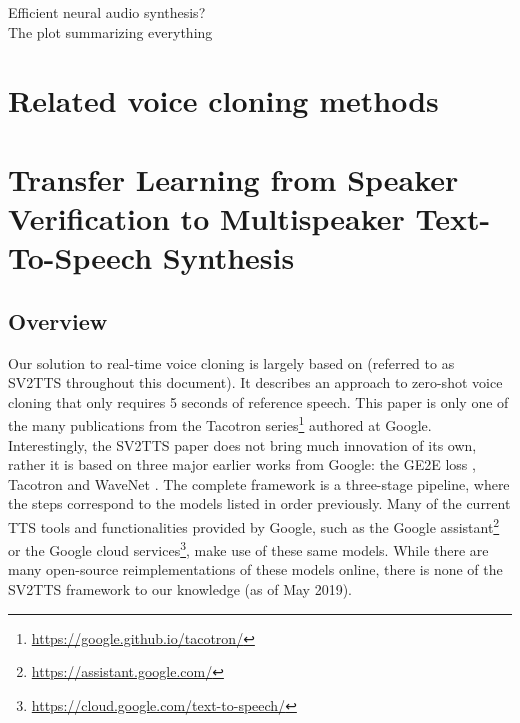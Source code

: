 \documentclass[a4paper, oneside, 12pt, english]{article}
\begin{document}
\color{red} Efficient neural audio synthesis? \\ The plot summarizing everything \color{black}

\section{Related voice cloning methods}



\section{Transfer Learning from Speaker Verification to Multispeaker Text-To-Speech Synthesis}
\subsection{Overview}
Our solution to real-time voice cloning is largely based on \citep{SV2TTS} (referred to as SV2TTS throughout this document). It describes an approach to zero-shot voice cloning that only requires 5 seconds of reference speech. This paper is only one of the many publications from the Tacotron series\footnote{\url{https://google.github.io/tacotron/}} authored at Google. Interestingly, the SV2TTS paper does not bring much innovation of its own, rather it is based on three major earlier works from Google: the GE2E loss \citep{GE2E}, Tacotron \citep{Tacotron1} and WaveNet \citep{WaveNet}. The complete framework is a three-stage pipeline, where the steps correspond to the models listed in order previously. Many of the current TTS tools and functionalities provided by Google, such as the Google assistant\footnote{\url{https://assistant.google.com/}} or the Google cloud services\footnote{\url{https://cloud.google.com/text-to-speech/}}, make use of these same models. While there are many open-source reimplementations of these models online, there is none of the SV2TTS framework to our knowledge (as of May 2019).
\end{document}
